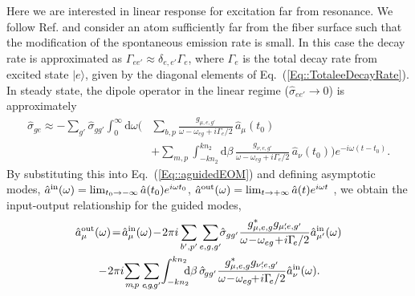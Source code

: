 \documentclass[preprint, aps,pra,onecolumn]{revtex4-1} %
\def\ket#1{\lvert{#1}\rangle}%
\newcommand{\erf}[1]{Eq.~(\ref{#1})}
\newcommand{\nn}{\nonumber}
\newcommand{\inp}{{\rm in}}
\newcommand{\out}{{\rm out}}
\begin{document}
Here we are interested in linear response for excitation far from resonance. We follow Ref. \cite{le_kien_propagation_2014} and consider an atom sufficiently far from the fiber surface such that the modification of the spontaneous emission rate is small.   In this case the decay rate is approximated as $\Gamma_{ee'} \approx \delta_{e,e'} \Gamma_{e}$, where $\Gamma_e$ is the total decay rate from excited state $\ket{e}$, given by the diagonal elements of \erf{Eq::TotaleeDecayRate}.  In steady state, the dipole operator in the linear regime ($\hat{\sigma}_{ee'} \rightarrow 0 $) is approximately
	\begin{align}
		\hat{\sigma}_{ge} \approx -\sum_{g'} \hat{\sigma}_{gg'}\int_0^{\infty}\mathrm{d}\omega \bigg( & \sum_{b,p}  
\frac{g_{\mu, e,g'}}{\omega-\omega_{eg} + i \Gamma_{e}/2  }\, \hat{a}_\mu (t_0) \\
	&+\sum_{m,p} \int_{-kn_2}^{kn_2}\mathrm{d}\beta \, \frac{g_{\nu, e,g'}}{\omega-\omega_{eg} + i \Gamma_{e}/2 } \,\hat{a}_\nu (t_0)  \bigg)e^{-i\omega (t-t_0)} . \nn
	\end{align}
By substituting this into \erf{Eq::aguidedEOM} and defining asymptotic modes, $\hat{a}^{\inp}(\omega) = \lim_{t_0\rightarrow -\infty} \hat{a}(t_0) e^{i\omega t_0}$, $\hat{a}^{\out}(\omega) = \lim_{t\rightarrow +\infty} \hat{a}(t) e^{i\omega t}$ \cite{fan_input-output_2010}, we obtain the input-output relationship for the guided modes, 
	\begin{align} \label{Eq::aout}
		\hat{a}^{\out}_\mu (\omega) &\!=\! \hat{a}^{\inp}_\mu (\omega) \!-\! 2\pi i\sum_{b',p'} 
\sum_{e,g,g'}\!\!\hat{\sigma}_{gg'}\frac{ g_{\mu,e,g}^* g_{\mu'\!\!,e,g'}}{ \omega \!-\! \omega_{eg} \!+\! i \Gamma\!_{e}/2 }\hat{a}^{\inp}_{\mu'}(\omega) \nn\\
&\!\!\!\!\!\!\!\!-\! 2\pi i\!\sum_{m\!,p} \sum_{e\!,g\!,g'}\! \int^{kn_2}_{-kn_2}\!\!\!\! \mathrm{d}\beta \,\hat{\sigma}\!_{gg'}\frac{ g_{\mu,e,g}^* g_{\nu'\!\!,e,g'}}{ \omega \!-\! \omega_{eg} \!\!+\! i \Gamma\!_{e}/2 }\hat{a}^{\inp}_{\nu}(\omega).
	\end{align}
	
\end{document}
